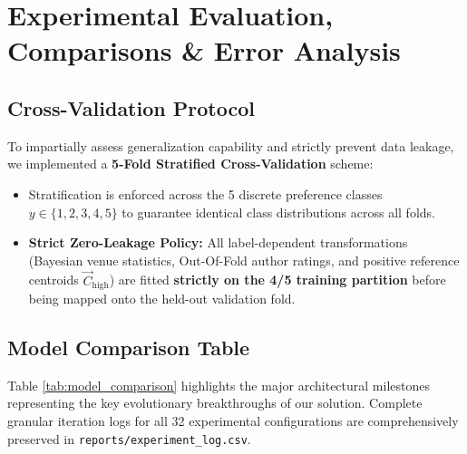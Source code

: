 \chapter{Experimental Evaluation, Comparisons \& Error Analysis}

\label{chap:evaluation}

\section{Cross-Validation Protocol}

To impartially assess generalization capability and strictly prevent data leakage, we implemented a \textbf{5-Fold Stratified Cross-Validation} scheme:

\begin{itemize}

  \item Stratification is enforced across the 5 discrete preference classes $y \in \{1, 2, 3, 4, 5\}$ to guarantee identical class distributions across all folds.

  \item \textbf{Strict Zero-Leakage Policy:} All label-dependent transformations (Bayesian venue statistics, Out-Of-Fold author ratings, and positive reference centroids $\vec{C}_{\text{high}}$) are fitted \textbf{strictly on the 4/5 training partition} before being mapped onto the held-out validation fold.

\end{itemize}

\section{Model Comparison Table}

Table \ref{tab:model_comparison} highlights the major architectural milestones representing the key evolutionary breakthroughs of our solution. Complete granular iteration logs for all 32 experimental configurations are comprehensively preserved in \texttt{reports/experiment_log.csv}.


